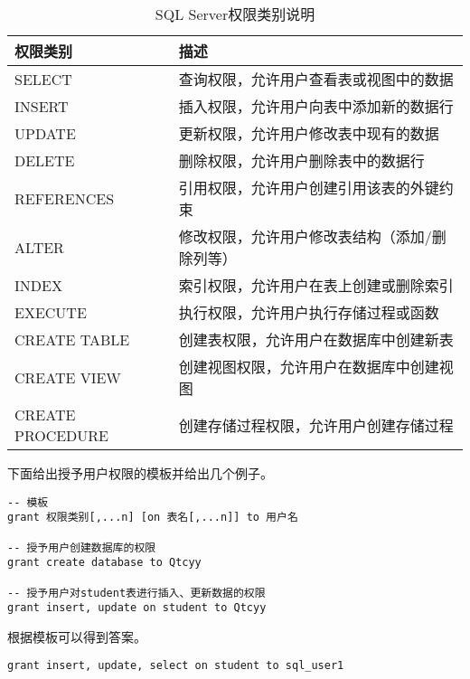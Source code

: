 \begin{table}[H]
  \centering
  \begin{tabularx}{\textwidth}{p{5cm}|X}
    \toprule
    \textbf{权限类别} & \textbf{描述} \\
    \hline
    SELECT & 查询权限，允许用户查看表或视图中的数据 \\
    INSERT & 插入权限，允许用户向表中添加新的数据行 \\
    UPDATE & 更新权限，允许用户修改表中现有的数据 \\
    DELETE & 删除权限，允许用户删除表中的数据行 \\
    REFERENCES & 引用权限，允许用户创建引用该表的外键约束 \\
    ALTER & 修改权限，允许用户修改表结构（添加/删除列等） \\
    INDEX & 索引权限，允许用户在表上创建或删除索引 \\
    EXECUTE & 执行权限，允许用户执行存储过程或函数 \\
    CREATE TABLE & 创建表权限，允许用户在数据库中创建新表 \\
    CREATE VIEW & 创建视图权限，允许用户在数据库中创建视图 \\
    CREATE PROCEDURE & 创建存储过程权限，允许用户创建存储过程 \\
    \bottomrule
  \end{tabularx}
  \caption{SQL Server权限类别说明}
  \label{table:2}
\end{table}

\qquad 下面给出授予用户权限的模板并给出几个例子。

\begin{mdframed}[backgroundcolor=gray!10]
\begin{verbatim}
-- 模板
grant 权限类别[,...n] [on 表名[,...n]] to 用户名

-- 授予用户创建数据库的权限
grant create database to Qtcyy

-- 授予用户对student表进行插入、更新数据的权限
grant insert, update on student to Qtcyy
\end{verbatim}
\end{mdframed}

\qquad 根据模板可以得到答案。

\begin{mdframed}[backgroundcolor=blue!5]
\begin{verbatim}
grant insert, update, select on student to sql_user1
\end{verbatim}
\end{mdframed}

